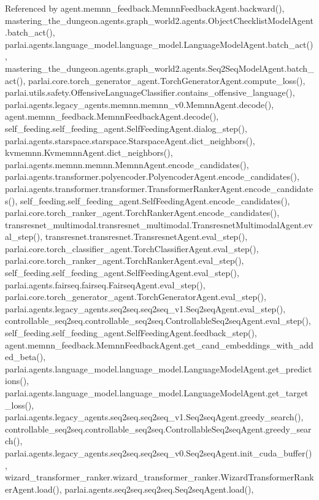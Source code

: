 Referenced by agent.\+memnn\+\_\+feedback.\+Memnn\+Feedback\+Agent.\+backward(), mastering\+\_\+the\+\_\+dungeon.\+agents.\+graph\+\_\+world2.\+agents.\+Object\+Checklist\+Model\+Agent.\+batch\+\_\+act(), parlai.\+agents.\+language\+\_\+model.\+language\+\_\+model.\+Language\+Model\+Agent.\+batch\+\_\+act(), mastering\+\_\+the\+\_\+dungeon.\+agents.\+graph\+\_\+world2.\+agents.\+Seq2\+Seq\+Model\+Agent.\+batch\+\_\+act(), parlai.\+core.\+torch\+\_\+generator\+\_\+agent.\+Torch\+Generator\+Agent.\+compute\+\_\+loss(), parlai.\+utils.\+safety.\+Offensive\+Language\+Classifier.\+contains\+\_\+offensive\+\_\+language(), parlai.\+agents.\+legacy\+\_\+agents.\+memnn.\+memnn\+\_\+v0.\+Memnn\+Agent.\+decode(), agent.\+memnn\+\_\+feedback.\+Memnn\+Feedback\+Agent.\+decode(), self\+\_\+feeding.\+self\+\_\+feeding\+\_\+agent.\+Self\+Feeding\+Agent.\+dialog\+\_\+step(), parlai.\+agents.\+starspace.\+starspace.\+Starspace\+Agent.\+dict\+\_\+neighbors(), kvmemnn.\+Kvmemnn\+Agent.\+dict\+\_\+neighbors(), parlai.\+agents.\+memnn.\+memnn.\+Memnn\+Agent.\+encode\+\_\+candidates(), parlai.\+agents.\+transformer.\+polyencoder.\+Polyencoder\+Agent.\+encode\+\_\+candidates(), parlai.\+agents.\+transformer.\+transformer.\+Transformer\+Ranker\+Agent.\+encode\+\_\+candidates(), self\+\_\+feeding.\+self\+\_\+feeding\+\_\+agent.\+Self\+Feeding\+Agent.\+encode\+\_\+candidates(), parlai.\+core.\+torch\+\_\+ranker\+\_\+agent.\+Torch\+Ranker\+Agent.\+encode\+\_\+candidates(), transresnet\+\_\+multimodal.\+transresnet\+\_\+multimodal.\+Transresnet\+Multimodal\+Agent.\+eval\+\_\+step(), transresnet.\+transresnet.\+Transresnet\+Agent.\+eval\+\_\+step(), parlai.\+core.\+torch\+\_\+classifier\+\_\+agent.\+Torch\+Classifier\+Agent.\+eval\+\_\+step(), parlai.\+core.\+torch\+\_\+ranker\+\_\+agent.\+Torch\+Ranker\+Agent.\+eval\+\_\+step(), self\+\_\+feeding.\+self\+\_\+feeding\+\_\+agent.\+Self\+Feeding\+Agent.\+eval\+\_\+step(), parlai.\+agents.\+fairseq.\+fairseq.\+Fairseq\+Agent.\+eval\+\_\+step(), parlai.\+core.\+torch\+\_\+generator\+\_\+agent.\+Torch\+Generator\+Agent.\+eval\+\_\+step(), parlai.\+agents.\+legacy\+\_\+agents.\+seq2seq.\+seq2seq\+\_\+v1.\+Seq2seq\+Agent.\+eval\+\_\+step(), controllable\+\_\+seq2seq.\+controllable\+\_\+seq2seq.\+Controllable\+Seq2seq\+Agent.\+eval\+\_\+step(), self\+\_\+feeding.\+self\+\_\+feeding\+\_\+agent.\+Self\+Feeding\+Agent.\+feedback\+\_\+step(), agent.\+memnn\+\_\+feedback.\+Memnn\+Feedback\+Agent.\+get\+\_\+cand\+\_\+embeddings\+\_\+with\+\_\+added\+\_\+beta(), parlai.\+agents.\+language\+\_\+model.\+language\+\_\+model.\+Language\+Model\+Agent.\+get\+\_\+predictions(), parlai.\+agents.\+language\+\_\+model.\+language\+\_\+model.\+Language\+Model\+Agent.\+get\+\_\+target\+\_\+loss(), parlai.\+agents.\+legacy\+\_\+agents.\+seq2seq.\+seq2seq\+\_\+v1.\+Seq2seq\+Agent.\+greedy\+\_\+search(), controllable\+\_\+seq2seq.\+controllable\+\_\+seq2seq.\+Controllable\+Seq2seq\+Agent.\+greedy\+\_\+search(), parlai.\+agents.\+legacy\+\_\+agents.\+seq2seq.\+seq2seq\+\_\+v0.\+Seq2seq\+Agent.\+init\+\_\+cuda\+\_\+buffer(), wizard\+\_\+transformer\+\_\+ranker.\+wizard\+\_\+transformer\+\_\+ranker.\+Wizard\+Transformer\+Ranker\+Agent.\+load(), parlai.\+agents.\+seq2seq.\+seq2seq.\+Seq2seq\+Agent.\+load(), 